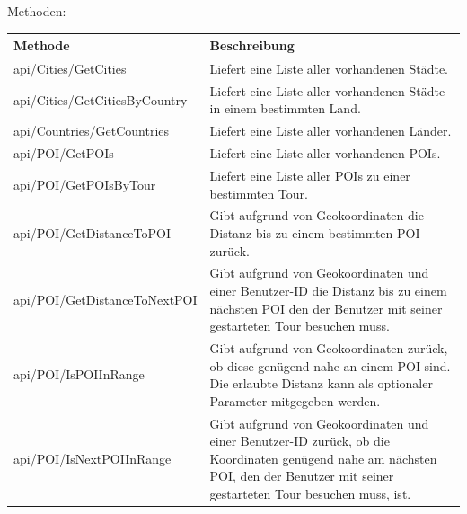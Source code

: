 \documentclass[a4paper,10pt,xetex]{article}
\begin{document}
Methoden:

\begin{longtabu} to \textwidth { | l | X[l] | }
\hline
\textbf{Methode} & \textbf{Beschreibung} \\
\hline
\endhead

api/Cities/GetCities &
Liefert eine Liste aller vorhandenen St\"adte.\\\hline
api/Cities/GetCitiesByCountry &
Liefert eine Liste aller vorhandenen St\"adte in einem bestimmten Land.\\\hline
  api/Countries/GetCountries &
Liefert eine Liste aller vorhandenen L\"ander.\\\hline
api/POI/GetPOIs &
Liefert eine Liste aller vorhandenen POIs.\\\hline
api/POI/GetPOIsByTour &
Liefert eine Liste aller POIs zu einer bestimmten Tour.\\\hline
api/POI/GetDistanceToPOI &
Gibt aufgrund von Geokoordinaten die Distanz bis zu einem bestimmten POI zur\"uck.\\\hline
api/POI/GetDistanceToNextPOI &
Gibt aufgrund von Geokoordinaten und einer Benutzer-ID die Distanz bis zu einem n\"achsten POI
  den der Benutzer mit seiner gestarteten Tour besuchen muss.\\\hline
api/POI/IsPOIInRange &
Gibt aufgrund von Geokoordinaten zur\"uck, ob diese gen\"ugend nahe an einem POI sind. Die
  erlaubte Distanz kann als optionaler Parameter mitgegeben werden. \\\hline
api/POI/IsNextPOIInRange &
Gibt aufgrund von Geokoordinaten und einer Benutzer-ID zur\"uck, ob die Koordinaten gen\"ugend
  nahe am n\"achsten POI, den der Benutzer mit seiner gestarteten Tour besuchen muss, ist.


\end{longtabu}
\end{document}
